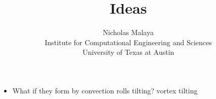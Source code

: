 \documentclass{article}
\title{\bf{Ideas}}
\author{Nicholas Malaya \\ Institute for Computational Engineering and Sciences \\ University of Texas at Austin} \date{}
\begin{document}
\maketitle

\newpage

\begin{itemize}
  \item What if they form by convection rolls tilting? vortex tilting
\end{itemize}
\end{document}
